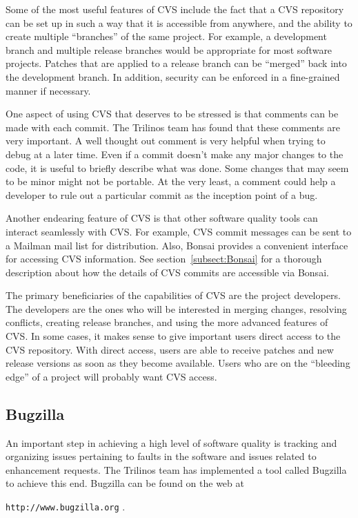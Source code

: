 \documentclass[12pt,relax]{article}
\newcommand{\InlineDirectory}[1]{
  {\hspace{0.01 in}} {\tt #1} {\hspace{0.01 in}}}
\begin{document}
Some of the most useful features of CVS include the fact that a CVS 
repository can be set up in such a way that it is accessible from anywhere, 
and the ability to create multiple ``branches'' of the same project.  For 
example, a development branch and multiple release branches would be 
appropriate for most software projects.  Patches that are applied 
to a release branch can be ``merged'' back into the development branch.  
In addition, security can be enforced in a fine-grained manner if necessary.  

One aspect of using CVS that deserves to be stressed is that comments can be 
made with each commit.  The Trilinos team has found that these comments are 
very important.  A well thought out comment is very helpful when trying to 
debug at a later time.  Even if a commit doesn't make any major changes to the 
code, it is useful to briefly describe what was done.  Some changes that may 
seem to be minor might not be portable.  At the very least, a comment could 
help a developer to rule out a particular commit as the inception point 
of a bug.

Another endearing feature of CVS is that other software quality tools can 
interact seamlessly with CVS.  For example, CVS commit messages can be sent to
a Mailman mail list for distribution.  Also, Bonsai provides a convenient 
interface for accessing CVS information.  See section~\ref{subsect:Bonsai} 
for a thorough description about how the details of CVS commits are accessible 
via Bonsai.

The primary beneficiaries of the capabilities of CVS are the project 
developers.  The developers are the ones who will be interested in merging 
changes, resolving conflicts, creating release branches, and using the more 
advanced features of CVS.  In some cases, it makes sense to give 
important users direct access to the CVS repository.  With direct access, 
users are able to receive patches and new release versions as soon as they 
become available.  Users who are on the ``bleeding edge'' of a project will 
probably want CVS access.

\subsection{Bugzilla}
\label{subsect:Bugzilla}
An important step in achieving a high level of software quality is tracking
and organizing issues pertaining to faults in the software and issues related 
to enhancement requests.  The Trilinos team has implemented a tool called 
Bugzilla~\cite{Bugzilla} to achieve this end.  Bugzilla  can be found 
on the web at \newline
\InlineDirectory{http://www.bugzilla.org}.
\end{document}
